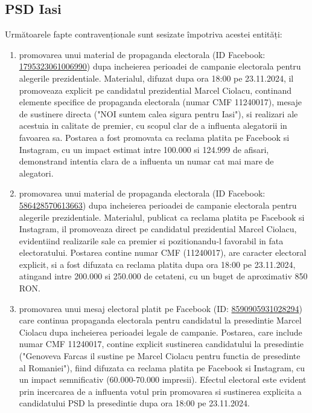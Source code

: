 \documentclass[a4paper,12pt]{article}
\begin{document}
\vspace{0.5cm}

\subsection{PSD Iasi}
Următoarele fapte contravenționale sunt sesizate împotriva acestei entități:

\begin{enumerate}[leftmargin=*, label=\arabic*.)]
    \item promovarea unui material de propaganda electorala (ID Facebook: \href{https://www.facebook.com/ads/library/?id=1795323061006990}{1795323061006990}) dupa incheierea perioadei de campanie electorala pentru alegerile prezidentiale. Materialul, difuzat dupa ora 18:00 pe 23.11.2024, il promoveaza explicit pe candidatul prezidential Marcel Ciolacu, continand elemente specifice de propaganda electorala (numar CMF 11240017), mesaje de sustinere directa ("NOI suntem calea sigura pentru Iasi"), si realizari ale acestuia in calitate de premier, cu scopul clar de a influenta alegatorii in favoarea sa. Postarea a fost promovata ca reclama platita pe Facebook si Instagram, cu un impact estimat intre 100.000 si 124.999 de afisari, demonstrand intentia clara de a influenta un numar cat mai mare de alegatori.
    \item promovarea unui material de propaganda electorala (ID Facebook: \href{https://www.facebook.com/ads/library/?id=586428570613663}{586428570613663}) dupa incheierea perioadei de campanie electorala pentru alegerile prezidentiale. Materialul, publicat ca reclama platita pe Facebook si Instagram, il promoveaza direct pe candidatul prezidential Marcel Ciolacu, evidentiind realizarile sale ca premier si pozitionandu-l favorabil in fata electoratului. Postarea contine numar CMF (11240017), are caracter electoral explicit, si a fost difuzata ca reclama platita dupa ora 18:00 pe 23.11.2024, atingand intre 200.000 si 250.000 de cetateni, cu un buget de aproximativ 850 RON.
    \item promovarea unui mesaj electoral platit pe Facebook (ID: \href{https://www.facebook.com/ads/library/?id=8590905931028294}{8590905931028294}) care continua propaganda electorala pentru candidatul la presedintie Marcel Ciolacu dupa incheierea perioadei legale de campanie. Postarea, care include numar CMF 11240017, contine explicit sustinerea candidatului la presedintie ("Genoveva Farcas il sustine pe Marcel Ciolacu pentru functia de presedinte al Romaniei"), fiind difuzata ca reclama platita pe Facebook si Instagram, cu un impact semnificativ (60.000-70.000 impresii). Efectul electoral este evident prin incercarea de a influenta votul prin promovarea si sustinerea explicita a candidatului PSD la presedintie dupa ora 18:00 pe 23.11.2024.
\end{enumerate}
\end{document}
